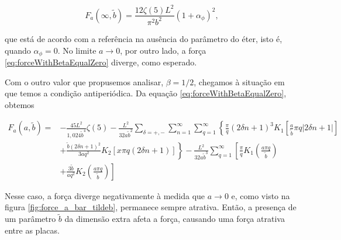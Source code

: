 \begin{equation}
    F_a (\infty, \tilde{b}) = \frac{12\zeta(5)L^2}{\pi^2b^2} (1 + \alpha_\phi)^2, \label{eq:eqLimitAlphaToInfty}
\end{equation}

que está de acordo com a referência \cite{Ambjoern1983} na ausência do parâmetro do éter, isto é,  quando $\alpha_\phi = 0$. No limite $a \to 0$, por outro lado, a força \eqref{eq:forceWithBetaEqualZero} diverge, como esperado.

Com o outro valor que propusemos analisar, $\beta = 1/2$, chegamos à situação em que temos a condição antiperiódica. Da equação \eqref{eq:forceWithBetaEqualZero}, obtemos

\begin{equation}
    \begin{aligned}
    F_a (a, \tilde{b}) =& -\frac{45L^2}{1,024\tilde{b}^4} \zeta(5) - \frac{L^2}{32a\tilde{b}^2} \sum_{\delta = +, -} \sum_{n=1}^{\infty} \sum_{q=1}^{\infty} \left\{ \frac{\pi}{q} (2\delta n + 1)^3 K_1 \left[ \frac{a}{\tilde{b}} \pi q |2\delta n + 1| \right] \right. \\
    &+ \left. \frac{\tilde{b} (2\delta n + 1)^2}{3aq^2} K_2 [x\pi q(2 \delta n + 1)] \right\} - \frac{L^2}{32a\tilde{b}^3} \sum_{q=1}^{\infty} \left[ \frac{\pi}{q} K_1 \left( \frac{a\pi q}{\tilde{b}} \right) \right. \\
     &+ \left. \frac{3 \tilde{b}}{aq^2} K_2 \left( \frac{a\pi q}{\tilde{b}} \right) \right]
    \end{aligned}
\end{equation}

Nesse caso, a força diverge negativamente à medida que $a \to 0$ e, como visto na figura \ref{fig:force_a_bar_tildeb}, permanece sempre atrativa. Então, a presença de um parâmetro $\tilde{b}$ da dimensão extra afeta a força, causando uma força atrativa entre as placas. 
